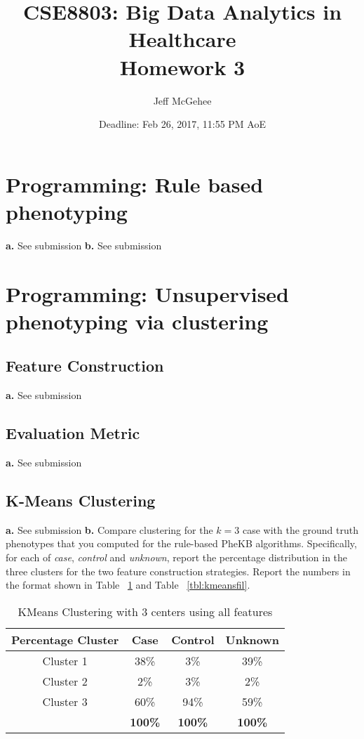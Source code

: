 \documentclass[12pt]{article}
\title{CSE8803: Big Data Analytics in Healthcare \\ Homework 3}
\author{Jeff McGehee}
\date{Deadline: Feb 26, 2017, 11:55 PM AoE}
\begin{document}
\maketitle

\section{Programming: Rule based phenotyping}
\textbf{a.} See submission \hfill \break
\textbf{b.} See submission


\section{Programming: Unsupervised phenotyping via clustering}

\subsection{Feature Construction }

\textbf{a.} See submission

\subsection{Evaluation Metric }

\textbf{a.} See submission

\subsection{K-Means Clustering}
\textbf{a.} See submission \hfill \break
\textbf{b.} Compare clustering for the $k=3$ case with the ground truth phenotypes that you computed for the rule-based PheKB algorithms. Specifically, for each of \textit{case}, \textit{control} and \textit{unknown}, report the percentage distribution in the three clusters for the two feature construction strategies. Report the numbers in the format shown in Table ~\ref{tbl:kmeansall} and Table ~\ref{tbl:kmeansfil}. \\

\begin{table}[!h]
\centering
\begin{tabular}{ c | c | c | c }
  \hline
  Percentage Cluster & Case & Control & Unknown\\
  \hline
  Cluster 1 & 38\% & 3\% & 39\% \\
  Cluster 2 & 2\% & 3\% & 2\% \\
  Cluster 3 & 60\% & 94\% & 59\% \\
  \hline
   & \bf{100\%} & \bf{100\%} & \bf{100\%} \\
  \hline
\end{tabular}
\caption{KMeans Clustering with 3 centers using all features}
\label{tbl:kmeansall}
\end{table}
\end{document}
